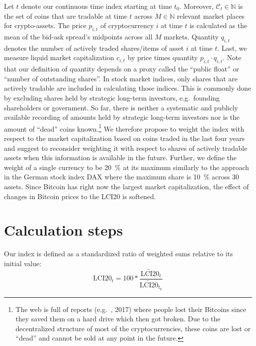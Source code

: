 \documentclass[11pt]{article}
\begin{document}
Let $t$ denote our continuous time index starting at time $t_0$.
Moreover, $\mathcal{C}_t \in \mathbb{N}$ is the set of coins that are tradable at time $t$ across $M \in \mathbb{N}$ relevant market places for crypto-assets.
The price $p_{i,t}$ of cryptocurrency $i$ at time $t$ is calculated as the mean of the bid-ask spread's midpoints across all $M$ markets.
Quantity $q_{i,t}$ denotes the number of actively traded shares/items of asset $i$ at time $t$.
Last, we measure liquid market capitalization $c_{i,t}$ by price times quantity $p_{i,t} \cdot q_{i,t}$.
Note that our definition of quantity depends on a proxy called the ``public float'' or ``number of outstanding shares''.
In stock market indices, only shares that are actively tradable are included in calculating those indices.
This is commonly done by excluding shares held by strategic long-term investors, e.g.\ founding shareholders or government.
So far, there is neither a systematic and publicly available recording of amounts held by strategic long-term investors nor is the amount of ``dead'' coins known.\footnote{The web is full of reports (e.g.\ \citeauthor{LetsTalkBitcoin}, 2017) where people lost their Bitcoins since they saved them on a hard drive which then got broken.
Due to the decentralized structure of most of the cryptocurrencies, these coins are lost or ``dead'' and cannot be sold at any point in the future.}
We therefore propose to weight the index with respect to the market capitalization based on coins traded in the last four years and suggest to reconsider weighting it with respect to shares of actively tradable assets when this information is available in the future.
Further, we define the weight of a single currency to be 20~\% at its maximum similarly to the approach in the German stock index DAX where the maximum share is 10~\% across 30 assets.
Since Bitcoin has right now the largest market capitalization, the effect of changes in Bitcoin prices to the LCI20 is softened.


\section{Calculation steps}

Our index is defined as a standardized ratio of weighted sums relative to its initial value:
\begin{equation}
  \text{LCI20}_t = 100 * \frac{\widetilde{\text{LCI20}}_t}{\widetilde{\text{LCI20}}_{t_0}}
\end{equation}
\end{document}
